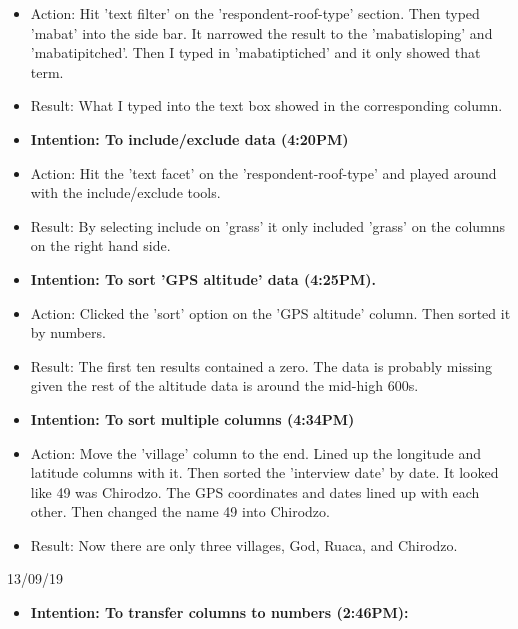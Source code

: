 \documentclass[a4paper,12pt]{article}
\begin{document}
\begin{itemize}
\begin{itemize}
\item Action: Hit 'text filter' on the 'respondent-roof-type' section. Then typed 'mabat' into the side bar. It narrowed the result to the 'mabatisloping' and 'mabatipitched'. Then I typed in 'mabatiptiched' and it only showed that term. 

\item Result: What I typed into the text box showed in the corresponding column. 

\item \textbf {Intention: To include/exclude data (4:20PM)}

\item Action: Hit the 'text facet' on the 'respondent-roof-type' and played around with the include/exclude tools.

\item Result: By selecting include on 'grass' it only included 'grass' on the columns on the right hand side.

\item \textbf{Intention: To sort 'GPS altitude' data (4:25PM).}

\item Action: Clicked the 'sort' option on the 'GPS altitude' column. Then sorted it by numbers.

\item Result: The first ten results contained a zero. The data is probably missing given the rest of the altitude data is around the mid-high 600s. 

\item \textbf{Intention: To sort multiple columns (4:34PM) }

\item Action: Move the 'village' column to the end. Lined up the longitude and latitude columns with it. Then sorted the 'interview date' by date. It looked like 49 was Chirodzo. The GPS coordinates and dates lined up with each other. Then changed the name 49 into Chirodzo. 

\item Result: Now there are only three villages, God, Ruaca, and Chirodzo. 

\end{itemize}

13/09/19

\begin{itemize}


\item \textbf{Intention: To transfer columns to numbers (2:46PM):}


\end{itemize}
\end{itemize}
\end{document}
